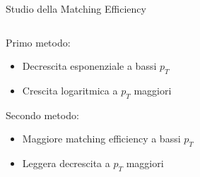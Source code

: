 \documentclass{beamer}
\begin{document}
\begin{frame}{Studio della Matching Efficiency}
\begin{columns}

    \begin{column}{0.55\textwidth}

    Primo metodo:
    \begin{itemize}
        \item Decrescita esponenziale a bassi $p_T$
        \item Crescita logaritmica a $p_T$ maggiori
    \end{itemize}

    Secondo metodo:
    \begin{itemize}
        \item Maggiore matching efficiency a bassi $p_T$
        \item Leggera decrescita a $p_T$ maggiori
    \end{itemize}
        
    \end{column}
    \begin{column}{0.5\textwidth}
        \centering
        \vspace{0.5 cm}
    \end{column}
\end{columns}

\vspace{0.5 cm}

\end{frame}






        
\end{document}
